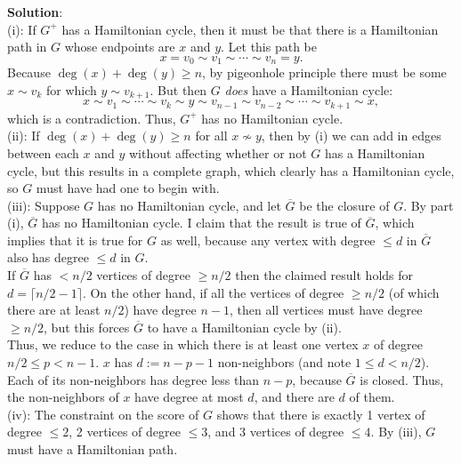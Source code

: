 \documentclass{amsart}
\begin{document}
	\textbf{Solution}:\\
	
	(i): If $G^+$ has a Hamiltonian cycle, then it must be that there is a Hamiltonian path in $G$ whose endpoints are $x$ and $y$. Let this path be
	$$
	x = v_0 \sim v_1 \sim \cdots \sim v_n = y.
	$$
	Because $\deg(x)+\deg(y)\geq n$, by pigeonhole principle there must be some $x\sim v_k$ for which $y\sim v_{k+1}$. But then $G$ \textit{does} have a Hamiltonian cycle:
	$$
	x \sim v_1 \sim \cdots \sim v_k \sim y \sim v_{n-1} \sim v_{n-2} \sim \cdots \sim v_{k+1} \sim x,
	$$
	which is a contradiction. Thus, $G^+$ has no Hamiltonian cycle.\\
	
	(ii): If $\deg(x)+\deg(y)\geq n$ for all $x\not\sim y$, then by (i) we can add in edges between each $x$ and $y$ without affecting whether or not $G$ has a Hamiltonian cycle, but this results in a complete graph, which clearly has a Hamiltonian cycle, so $G$ must have had one to begin with.\\
	
	(iii): Suppose $G$ has no Hamiltonian cycle, and let $\overline{G}$ be the closure of $G$. By part (i), $\overline{G}$ has no Hamiltonian cycle. I claim that the result is true of $\overline{G}$, which implies that it is true for $G$ as well, because any vertex with degree $\leq d$ in $\overline{G}$ also has degree $\leq d$ in $G$.\\
	
	If $\overline{G}$ has $< n/2$ vertices of degree $\geq n/2$ then the claimed result holds for $d=\lceil n/2 - 1 \rceil$. On the other hand, if all the vertices of degree $\geq n/2$ (of which there are at least $n/2$) have degree $n-1$, then all vertices must have degree $\geq n/2$, but this forces $\overline{G}$ to have a Hamiltonian cycle by (ii).\\
	
	Thus, we reduce to the case in which there is at least one vertex $x$ of degree $n/2 \leq p < n-1$. $x$ has $d:= n-p-1$ non-neighbors (and note $1\leq d < n/2$). Each of its non-neighbors has degree less than $n-p$, because $\overline{G}$ is closed. Thus, the non-neighbors of $x$ have degree at most $d$, and there are $d$ of them.\\
	
	(iv): The constraint on the score of $G$ shows that there is exactly 1 vertex of degree $\leq 2$, 2 vertices of degree $\leq 3$, and $3$ vertices of degree $\leq 4$. By (iii), $G$ must have a Hamiltonian path.
	
	
	
	
\end{document}
